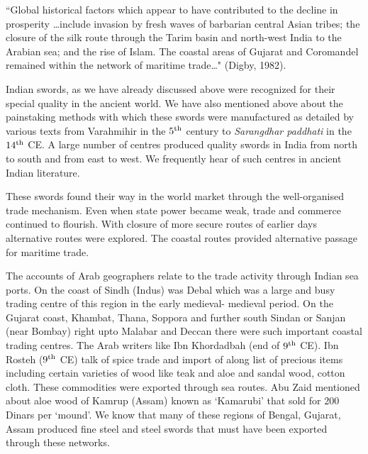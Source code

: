 ``Global historical factors which appear to have contributed to the decline in prosperity …include invasion by fresh waves of barbarian central Asian tribes; the closure of the silk route through the Tarim basin and north-west India to the Arabian sea; and the rise of Islam. The coastal areas of Gujarat and Coromandel remained within the network of maritime trade…" (Digby, 1982).

Indian swords, as we have already discussed above were recognized for their special quality in the ancient world. We have also mentioned above about the painstaking methods with which these swords were manufactured as detailed by various texts from Varahmihir in the $5^{\rm th}$ century to {\it Sarangdhar paddhati} in the $14^{\rm th}$ CE. A large number of centres produced quality swords in India from north to south and from east to west. We frequently hear of such centres in ancient Indian literature.

These swords found their way in the world market through the well-organised trade mechanism. Even when state power became weak, trade and commerce continued to flourish. With closure of more secure routes of earlier days alternative routes were explored. The coastal routes provided alternative passage for maritime trade.

The accounts of Arab geographers relate to the trade activity through Indian sea ports. On the coast of Sindh (Indus) was Debal which was a large and busy trading centre of this region in the early medieval- medieval period. On the Gujarat coast, Khambat, Thana, Soppora and further south Sindan or Sanjan (near Bombay) right upto Malabar and Deccan there were such important coastal trading centres. The Arab writers like Ibn Khordadbah (end of $9^{\rm th}$ CE). Ibn Rosteh ($9^{\rm th}$ CE) talk of spice trade and import of along list of precious items including certain varieties of wood like teak and aloe and sandal wood, cotton cloth. These commodities were exported through sea routes. Abu Zaid mentioned about aloe wood of Kamrup (Assam) known as `Kamarubi' that sold for 200 Dinars per `mound'. We know that many of these regions of Bengal, Gujarat, Assam produced fine steel and steel swords that must have been exported through these networks.

